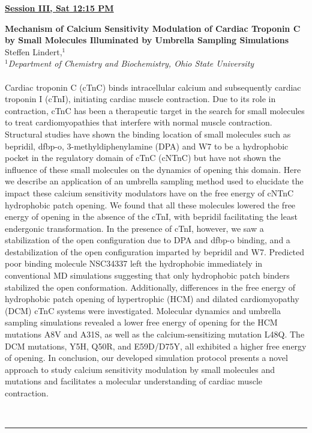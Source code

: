 \documentclass[titlepage,oneside,openany,10pt]{book}
\newenvironment{oralabs}[4] %
        {
        \begin{flushright}
                \underline{\textbf{#4}}
        \end{flushright}
        \textbf{#1}\\%
        #2\\%
        \textit{#3}\\\\%
        }
        {
        \\
        \noindent\rule{15cm}{0.5pt}%
        }
\begin{document}
\vspace{1cm}

\begin{oralabs}
	{Mechanism of Calcium Sensitivity Modulation of Cardiac Troponin C by Small Molecules Illuminated by Umbrella Sampling Simulations}
	{Steffen Lindert,$^{1}$}
	{
	$^1$Department of Chemistry and Biochemistry, Ohio State University
	}
	{Session III, Sat 12:15 PM}
	Cardiac troponin C (cTnC) binds intracellular calcium and subsequently cardiac troponin I (cTnI), initiating cardiac muscle contraction. Due to its role in contraction, cTnC has been a therapeutic target in the search for small molecules to treat cardiomyopathies that interfere with normal muscle contraction. Structural studies have shown the binding location of small molecules such as bepridil, dfbp-o, 3-methyldiphenylamine (DPA) and W7 to be a hydrophobic pocket in the regulatory domain of cTnC (cNTnC) but have not shown the influence of these small molecules on the dynamics of opening this domain. Here we describe an application of an umbrella sampling method used to elucidate the impact these calcium sensitivity modulators have on the free energy of cNTnC hydrophobic patch opening. We found that all these molecules lowered the free energy of opening in the absence of the cTnI, with bepridil facilitating the least endergonic transformation. In the presence of cTnI, however, we saw a stabilization of the open configuration due to DPA and dfbp-o binding, and a destabilization of the open configuration imparted by bepridil and W7. Predicted poor binding molecule NSC34337 left the hydrophobic immediately in conventional MD simulations suggesting that only hydrophobic patch binders stabilized the open conformation. Additionally, differences in the free energy of hydrophobic patch opening of hypertrophic (HCM) and dilated cardiomyopathy (DCM) cTnC systems were investigated. Molecular dynamics and umbrella sampling simulations revealed a lower free energy of opening for the HCM mutations A8V and A31S, as well as the calcium-sensitizing mutation L48Q. The DCM mutations, Y5H, Q50R, and E59D/D75Y, all exhibited a higher free energy of opening. In conclusion, our developed simulation protocol presents a novel approach to study calcium sensitivity modulation by small molecules and mutations and facilitates a molecular understanding of cardiac muscle contraction.
	\label{LindertS}
\end{oralabs}
\end{document}
